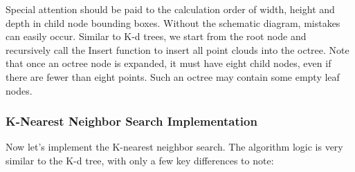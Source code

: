 Special attention should be paid to the calculation order of width, height and depth in child node bounding boxes. Without the schematic diagram, mistakes can easily occur. Similar to K-d trees, we start from the root node and recursively call the Insert function to insert all point clouds into the octree. Note that once an octree node is expanded, it must have eight child nodes, even if there are fewer than eight points. Such an octree may contain some empty leaf nodes.

\subsubsection{K-Nearest Neighbor Search Implementation}
Now let's implement the K-nearest neighbor search. The algorithm logic is very similar to the K-d tree, with only a few key differences to note:

